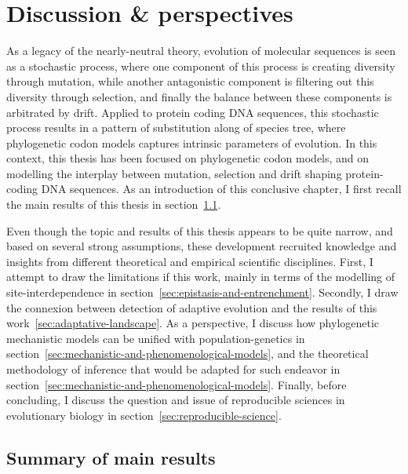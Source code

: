 \chapter{Discussion \& perspectives}
\label{ch:discussion-perspectives}
{\hypersetup{linkcolor=GREYDARK}\minitoc}

As a legacy of the nearly-neutral theory, evolution of molecular sequences is seen as a stochastic process, where one component of this process is creating diversity through mutation, while another antagonistic component is filtering out this diversity through selection, and finally the balance between these components is arbitrated by drift.
Applied to protein coding DNA sequences, this stochastic process results in a pattern of substitution along of species tree, where phylogenetic codon models captures intrinsic parameters of evolution.
In this context, this thesis has been focused on phylogenetic codon models, and on modelling the interplay between mutation, selection and drift shaping protein-coding DNA sequences.
As an introduction of this conclusive chapter, I first recall the main results of this thesis in section~\ref{sec:summary-of-main-results}.

Even though the topic and results of this thesis appears to be quite narrow, and based on several strong assumptions, these development recruited knowledge and insights from different theoretical and empirical scientific disciplines.
First, I attempt to draw the limitations if this work, mainly in terms of the modelling of site-interdependence in section~\ref{sec:epistasis-and-entrenchment}.
Secondly, I draw the connexion between detection of adaptive evolution and the results of this work~\ref{sec:adaptative-landscape}.
As a perspective, I discuss how phylogenetic mechanistic models can be unified with population-genetics in section~\ref{sec:mechanistic-and-phenomenological-models}, and the theoretical methodology of inference that would be adapted for such endeavor in section~\ref{sec:mechanistic-and-phenomenological-models}.
Finally, before concluding, I discuss the question and issue of reproducible sciences in evolutionary biology in section~\ref{sec:reproducible-science}.


\section{Summary of main results}
\label{sec:summary-of-main-results}

